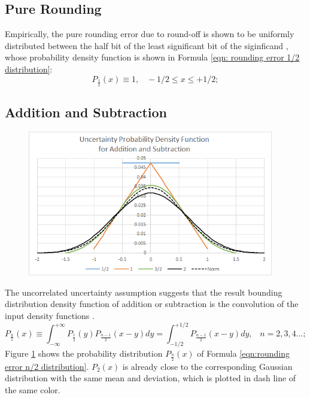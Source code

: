 \documentclass[twoside]{article}
\numberwithin{equation}{section}
\newcommand{\eqspace}{\;\;\;}
\begin{document}
\subsection{Pure Rounding}

Empirically, the pure rounding error due to round-off is shown to be uniformly distributed between the half bit of the least significant bit of the siginficand \cite{Prev_Precision_Arithmetic}, whose probability density function is shown in Formula \eqref{eqn: rounding error 1/2 distribution}:
\begin{equation}
\label{eqn: rounding error 1/2 distribution}
P_{\frac{1}{2}}(x) \equiv 1, \eqspace  -1/2 \leq x \leq +1/2; 
\end{equation}



\subsection{Addition and Subtraction  \cite{Prev_Precision_Arithmetic}}

\begin{figure}
\centering
\includegraphics[height=2.5in]{Prec_Add_ErrDist.png}
\label{fig: Prec_Add_Err_Dist}
\end{figure}


The uncorrelated uncertainty assumption suggests that the result bounding distribution density function of addition or subtraction is the convolution of the input density functions \cite{Probability_Statistics}.  
\begin{equation}
\label{eqn:rounding error n/2 distribution}
P_{\frac{n}{2}}(x) \equiv \int _{-\infty}^{+\infty}P_{\frac{1}{2}}(y)P_{\frac{n-1}{2}}(x-y)dy=\int _{-1/2}^{+1/2}P_{\frac{n-1}{2}}(x-y) dy,\eqspace n=2,3,4\dots;
\end{equation}
Figure \ref{fig: Prec_Add_Err_Dist} shows the probability distribution $P_{\frac{n}{2}}(x)$ of Formula \eqref{eqn:rounding error n/2 distribution}.  
$P_{2}(x)$ is already close to the corresponding Gaussian distribution with the same mean and deviation, which is plotted in dash line of the same color.
\end{document}

